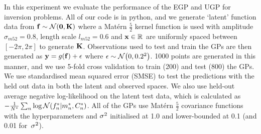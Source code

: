 \documentclass{article} %
\begin{document}
In this experiment we evaluate the performance of the EGP and UGP for inversion
problems. All of our code is in python, and we generate `latent' function data
from $\mathbf{f} \sim \mathcal{N}\!\left({\mathbf{0}, \mathbf{K}}\right)$ where a Mat\'ern $\frac{5}{2}$
kernel function is used with amplitude $\sigma_{m52} = 0.8$, length scale
$l_{m52} = 0.6$ and $\mathbf{x} \in \mathbb{R}^{}$ are uniformly spaced between $[-2\pi,
2\pi]$ to generate $\mathbf{K}$. Observations used to test and train the GPs are
then generated as $\mathbf{y} = g\!\left({{\mathbf{f}}}\right) + \epsilon$ where $\epsilon \sim
\mathcal{N}\!\left({0, 0.2^2}\right)$.  1000 points are generated in this manner, and we use 5-fold
cross validation to train (200) and test (800) the GPs. We use standardised
mean squared error (SMSE) to test the predictions with the held out data in
both the latent and observed spaces. We also use held-out average negative
log-likelihood on the latent test data, which is calculated as
$-\frac{1}{N^{*}} \sum_{n} \log \mathcal{N}\!\left({f_n^{*}}\middle\vert{\ensuremath{m}_n\ensuremath{^{*}},
    \ensuremath{C}_n\ensuremath{^{*}}}\right)$. All of the GPs use Mat\'ern $\frac{5}{2}$ covariance
functions with the hyperparameters and $\sigma^2$ initialised at 1.0 and
lower-bounded at 0.1 (and 0.01 for~$\sigma^2$).
\end{document}
